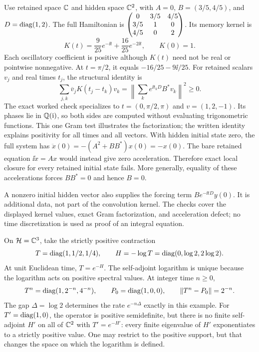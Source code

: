 Use retained space $\mathbb C$ and hidden space $\mathbb C^2$, with $A=0$, $B=(3/5,4/5)$, and $D=\operatorname{diag}(1,2)$. The full Hamiltonian is $\begin{pmatrix}0&3/5&4/5\\3/5&1&0\\4/5&0&2\end{pmatrix}$. Its memory kernel is
\[
K(t)=\frac9{25}e^{-\ii t}+\frac{16}{25}e^{-2\ii t},
\qquad K(0)=1.
\]
Each oscillatory coefficient is positive although $K(t)$ need not be real or pointwise nonnegative. At $t=\pi/2$, it equals $-16/25-9\ii/25$.
For retained scalars $v_j$ and real times $t_j$, the structural identity is
\[
\sum_{j,k}\overline v_jK(t_j-t_k)v_k
=\left\|\sum_k e^{\ii t_kD}B^*v_k\right\|^2\geq0.
\]
The exact worked check specializes to $t=(0,\pi/2,\pi)$ and $v=(1,2,-1)$. Its phases lie in $\mathbb Q(\mathrm i)$, so both sides are computed without evaluating trigonometric functions. This one Gram test illustrates the factorization; the written identity explains positivity for all times and all vectors.
With hidden initial state zero, the full system has $\ddot x(0)=-(A^2+BB^*)x(0)=-x(0)$. The bare retained equation $\ii\dot x=Ax$ would instead give zero acceleration. Therefore exact local closure for every retained initial state fails. More generally, equality of these accelerations forces $BB^*=0$ and hence $B=0$.

A nonzero initial hidden vector also supplies the forcing term $Be^{-\ii tD}y(0)$. It is additional data, not part of the convolution kernel. The checks cover the displayed kernel values, exact Gram factorization, and acceleration defect; no time discretization is used as proof of an integral equation.

On $\mathcal H=\mathbb C^3$, take the strictly positive contraction
\[
T=\operatorname{diag}(1,1/2,1/4),\qquad H=-\log T=\operatorname{diag}(0,\log2,2\log2).
\]
At unit Euclidean time, $T=e^{-H}$. The self-adjoint logarithm is unique because the logarithm acts on positive spectral values. At integer time $n\geq0$,
\[
T^n=\operatorname{diag}(1,2^{-n},4^{-n}),\qquad
P_0=\operatorname{diag}(1,0,0),\qquad\left\lVert T^n-P_0\right\rVert=2^{-n}.
\]
The gap $\Delta=\log2$ determines the rate $e^{-n\Delta}$ exactly in this example.
For $T'=\operatorname{diag}(1,0)$, the operator is positive semidefinite, but there is no finite self-adjoint $H'$ on all of $\mathbb C^2$ with $T'=e^{-H'}$: every finite eigenvalue of $H'$ exponentiates to a strictly positive value. One may restrict to the positive support, but that changes the space on which the logarithm is defined.

